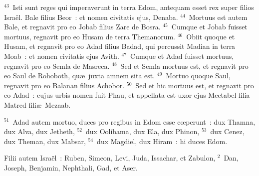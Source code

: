 ${}^{43}$~Isti sunt reges qui imperaverunt in terra Edom, antequam esset rex super filios Isra\"el. Bale filius Beor~: et nomen civitatis ejus, Denaba.
${}^{44}$~Mortuus est autem Bale, et regnavit pro eo Jobab filius Zare de Bosra.
${}^{45}$~Cumque et Jobab fuisset mortuus, regnavit pro eo Husam de terra Themanorum.
${}^{46}$~Obiit quoque et Husam, et regnavit pro eo Adad filius Badad, qui percussit Madian in terra Moab~: et nomen civitatis ejus Avith.
${}^{47}$~Cumque et Adad fuisset mortuus, regnavit pro eo Semla de Masreca.
${}^{48}$~Sed et Semla mortuus est, et regnavit pro eo Saul de Rohoboth, qu\ae\ juxta amnem sita est.
${}^{49}$~Mortuo quoque Saul, regnavit pro eo Balanan filius Achobor.
${}^{50}$~Sed et hic mortuus est, et regnavit pro eo Adad~: cujus urbis nomen fuit Phau, et appellata est uxor ejus Meetabel filia Matred fili\ae\ Mezaab.


${}^{51}$~Adad autem mortuo, duces pro regibus in Edom esse cœperunt~: dux Thamna, dux Alva, dux Jetheth,
${}^{52}$~dux Oolibama, dux Ela, dux Phinon,
${}^{53}$~dux Cenez, dux Theman, dux Mabsar,
${}^{54}$~dux Magdiel, dux Hiram~: hi duces Edom.

\bchapter
\lettrine[lines=3,image=true,loversize=0.05,lraise=-0.03]{F}{}ilii autem Isra\"el~: Ruben, Simeon, Levi, Juda, Issachar, et Zabulon,
${}^{2}$~Dan, Joseph, Benjamin, Nephthali, Gad, et Aser.


